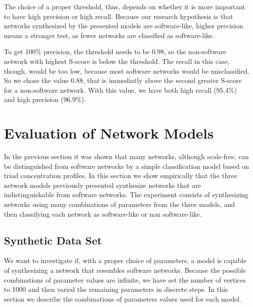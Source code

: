 The choice of a proper threshold, thus, depends on whether it is more important
to have high precision or high recall. Because our research hypothesis is that
networks synthesized by the presented models are software-like, higher precision
means a stronger test, as fewer networks are classified as software-like.

To get 100\% precision, the threshold needs to be 0.98, so the non-software
network with highest S-score is below the threshold. The recall in this case,
though, would be too low, because most software networks would be misclassified.
So we chose the value 0.88, that is immediatly above the second greater S-score
for a non-software network. With this value, we have both high recall (95.4\%)
and high precision (96.9\%).



\section{Evaluation of Network Models} \label{sec:evaluation}

In the previous section it was shown that many networks, although scale-free,
can be distinguished from software networks by a simple classification model
based on triad concentration profiles. In this section we show empirically that
the three network models previously presented synthesize networks that are
indistinguishable from software networks.
The experiment consists of synthesizing networks using many combinations of
parameters from the three models, and then classifying each network as
software-like or non software-like. %

\subsection{Synthetic Data Set}

We want to investigate if, with a proper choice of parameters, a model is
capable of synthesizing a network that resembles software networks. Because the
possible combinations of parameter values are infinite, we have set the number
of vertices to 1000 and then varied the remaining parameters in discrete steps.
In this section we describe the combinations of parameters values used for each
model.

